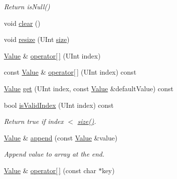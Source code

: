\begin{DoxyCompactItemize}
\begin{DoxyCompactList}\small\item\em Return is\-Null() \end{DoxyCompactList}\item 
void \hyperlink{protocol_json_1_1_j_s_o_n___a_p_i_a797068fda331886f3d122d851d1d1927}{clear} ()
\item 
void \hyperlink{protocol_json_1_1_j_s_o_n___a_p_i_ab50185f6fb23e943d6af6fbac8ffde7a}{resize} (U\-Int \hyperlink{protocol_json_1_1_j_s_o_n___a_p_i_a59da16946e6731036931b55a99a75515}{size})
\item 
\hyperlink{protocol_json_1_1_j_s_o_n___a_p_i_a3a85c4423131080eb9300546d6130dfd}{Value} \& \hyperlink{protocol_json_1_1_j_s_o_n___a_p_i_afde1c2fbf32013aa59a1cf1d34d772e4}{operator\mbox{[}$\,$\mbox{]}} (U\-Int index)
\item 
const \hyperlink{protocol_json_1_1_j_s_o_n___a_p_i_a3a85c4423131080eb9300546d6130dfd}{Value} \& \hyperlink{protocol_json_1_1_j_s_o_n___a_p_i_a5208dd58be0836ad3fdc975eae30d8f2}{operator\mbox{[}$\,$\mbox{]}} (U\-Int index) const 
\item 
\hyperlink{protocol_json_1_1_j_s_o_n___a_p_i_a3a85c4423131080eb9300546d6130dfd}{Value} \hyperlink{protocol_json_1_1_j_s_o_n___a_p_i_a9d2d6f0eee92a5f5f5a671a0aecab038}{get} (U\-Int index, const \hyperlink{protocol_json_1_1_j_s_o_n___a_p_i_a3a85c4423131080eb9300546d6130dfd}{Value} \&default\-Value) const 
\item 
\hypertarget{protocol_json_1_1_j_s_o_n___a_p_i_a8b89e8a408b6011c0b91d95a04de4298}{bool \hyperlink{protocol_json_1_1_j_s_o_n___a_p_i_a8b89e8a408b6011c0b91d95a04de4298}{is\-Valid\-Index} (U\-Int index) const }\label{protocol_json_1_1_j_s_o_n___a_p_i_a8b89e8a408b6011c0b91d95a04de4298}

\begin{DoxyCompactList}\small\item\em Return true if index $<$ \hyperlink{protocol_json_1_1_j_s_o_n___a_p_i_a59da16946e6731036931b55a99a75515}{size()}. \end{DoxyCompactList}\item 
\hyperlink{protocol_json_1_1_j_s_o_n___a_p_i_a3a85c4423131080eb9300546d6130dfd}{Value} \& \hyperlink{protocol_json_1_1_j_s_o_n___a_p_i_a31921682fc5b1489f9c8c877f713bfba}{append} (const \hyperlink{protocol_json_1_1_j_s_o_n___a_p_i_a3a85c4423131080eb9300546d6130dfd}{Value} \&value)
\begin{DoxyCompactList}\small\item\em Append value to array at the end. \end{DoxyCompactList}\item 
\hypertarget{protocol_json_1_1_j_s_o_n___a_p_i_ad8f864b718e965c32025be4baa6eef1a}{\hyperlink{protocol_json_1_1_j_s_o_n___a_p_i_a3a85c4423131080eb9300546d6130dfd}{Value} \& \hyperlink{protocol_json_1_1_j_s_o_n___a_p_i_ad8f864b718e965c32025be4baa6eef1a}{operator\mbox{[}$\,$\mbox{]}} (const char $\ast$key)}\label{protocol_json_1_1_j_s_o_n___a_p_i_ad8f864b718e965c32025be4baa6eef1a}


\end{DoxyCompactItemize}
